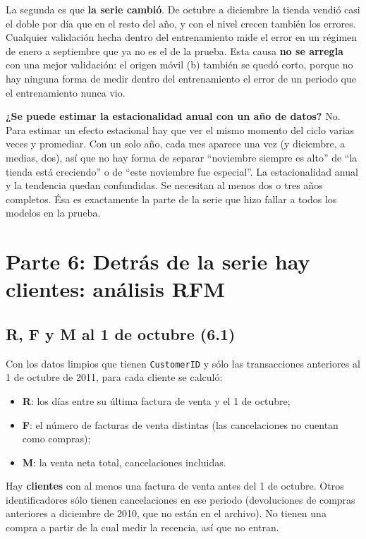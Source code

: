 \documentclass[11pt,letterpaper]{article}
\newcommand{\code}[1]{\texttt{#1}}
\newenvironment{respuesta}{\par\medskip}{\par\medskip}
\begin{document}
La segunda es que \textbf{la serie cambió}. De octubre a diciembre la tienda
vendió casi el doble por día que en el resto del año, y con el nivel crecen
también los errores. Cualquier validación hecha dentro del entrenamiento
mide el error en un régimen de enero a septiembre que ya no es el de la
prueba. Esta causa \textbf{no se arregla} con una mejor validación: el
origen móvil (b) también se quedó corto, porque no hay ninguna forma de
medir dentro del entrenamiento el error de un periodo que el entrenamiento
nunca vio.

\begin{respuesta}
\textbf{¿Se puede estimar la estacionalidad anual con un año de datos?} No.
Para estimar un efecto estacional hay que ver el mismo momento del ciclo
varias veces y promediar. Con un solo año, cada mes aparece una vez (y
diciembre, a medias, dos), así que no hay forma de separar ``noviembre
siempre es alto'' de ``la tienda está creciendo'' o de ``este noviembre fue
especial''. La estacionalidad anual y la tendencia quedan confundidas. Se
necesitan al menos dos o tres años completos. Ésa es exactamente la parte
de la serie que hizo fallar a todos los modelos en la prueba.
\end{respuesta}

\newpage
\section{Parte 6: Detrás de la serie hay clientes: análisis RFM}

\subsection{R, F y M al 1 de octubre (6.1)}

Con los datos limpios que tienen \code{CustomerID} y sólo las transacciones
anteriores al 1 de octubre de 2011, para cada cliente se calculó:
\begin{itemize}[leftmargin=1.2em]
\item \textbf{R}: los días entre su última factura de venta y el 1 de octubre;
\item \textbf{F}: el número de facturas de venta distintas (las cancelaciones
no cuentan como compras);
\item \textbf{M}: la venta neta total, cancelaciones incluidas.
\end{itemize}

Hay \textbf{\ClientesRFM{} clientes} con al menos una factura de venta antes
del 1 de octubre. Otros \ClientesSoloCancel{} identificadores sólo tienen
cancelaciones en ese periodo (devoluciones de compras anteriores a diciembre
de 2010, que no están en el archivo). No tienen una compra a partir de la
cual medir la recencia, así que no entran.
\end{document}
